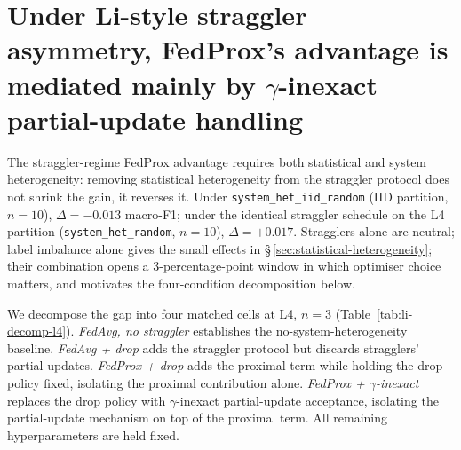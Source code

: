 \documentclass[11pt,a4paper]{report}
\begin{document}


\section{Under Li-style straggler asymmetry, FedProx's advantage is mediated
mainly by $\gamma$-inexact partial-update handling}
\label{sec:li-straggler}

The straggler-regime FedProx advantage requires both statistical and system
heterogeneity: removing statistical heterogeneity from the straggler
protocol does not shrink the gain, it reverses it. Under
\texttt{system\_het\_iid\_random} (IID partition, $n=10$), $\Delta = -0.013$
macro-F1; under the identical straggler schedule on the L4 partition
(\texttt{system\_het\_random}, $n=10$), $\Delta = +0.017$. Stragglers alone
are neutral; label imbalance alone gives the small effects in
\S\,\ref{sec:statistical-heterogeneity}; their combination opens a
$3$-percentage-point window in which optimiser choice matters, and
motivates the four-condition decomposition below.

We decompose the gap into four matched cells at L4, $n=3$
(Table~\ref{tab:li-decomp-l4}). \emph{FedAvg, no straggler} establishes the
no-system-heterogeneity baseline. \emph{FedAvg + drop} adds the straggler
protocol but discards stragglers' partial updates. \emph{FedProx + drop}
adds the proximal term while holding the drop policy fixed, isolating the
proximal contribution alone. \emph{FedProx + $\gamma$-inexact} replaces the
drop policy with $\gamma$-inexact partial-update acceptance, isolating the
partial-update mechanism on top of the proximal term. All remaining
hyperparameters are held fixed.
\end{document}

